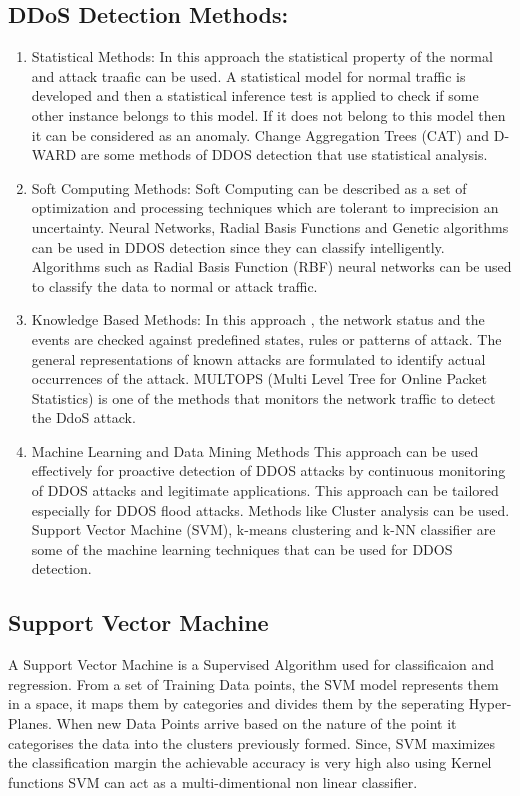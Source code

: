 \documentclass[12pt,a4paper,final]{report}
\begin{document}
\subsection{DDoS Detection Methods:}
\begin{enumerate}
\item
Statistical Methods:
\newline
In this approach the statistical property of the normal and attack traafic can be used. A statistical model for normal traffic is developed and then a statistical inference test is applied to check if some other instance belongs to this model. If it does not belong to this model then it can be considered as an anomaly. Change Aggregation Trees (CAT) and D-WARD are some methods of DDOS detection that use statistical analysis.

\item
Soft Computing Methods:
\newline
Soft Computing can be described as a set of optimization and processing techniques which are tolerant to imprecision an uncertainty. Neural Networks, Radial Basis Functions and Genetic algorithms can be used in DDOS detection since they can classify intelligently. Algorithms such as Radial Basis Function (RBF) neural networks can be used to classify the data to normal or attack traffic.

\item
Knowledge Based Methods:
\newline
In this approach , the network status and the events are checked against predefined states, rules or patterns of attack. The general representations of known attacks are formulated to identify actual occurrences of the attack. MULTOPS (Multi Level Tree for Online Packet Statistics) is one of the methods that monitors the network traffic to detect the DdoS attack.

\item
Machine Learning and Data Mining Methods
\newline
This approach can be used effectively for proactive detection of DDOS attacks by continuous monitoring of DDOS attacks and legitimate applications. This approach can be tailored especially for DDOS flood attacks. Methods like Cluster analysis can be used. Support Vector Machine (SVM), k-means clustering and k-NN classifier are some of the machine learning techniques that can be used for DDOS detection.
\end{enumerate}

\subsection{Support Vector Machine}
A Support Vector Machine\cite{BasePaper7}\cite{BasePaper8} is a Supervised Algorithm used for classificaion and regression. From a
set of Training Data points, the SVM model represents them in a space, it maps them by
categories and divides them by the seperating Hyper-Planes. When new Data Points arrive based
on the nature of the point it categorises the data into the clusters previously formed. Since, SVM
maximizes the classification margin the achievable accuracy is very high also using Kernel functions
SVM can act as a multi-dimentional non linear classifier.
\end{document}
